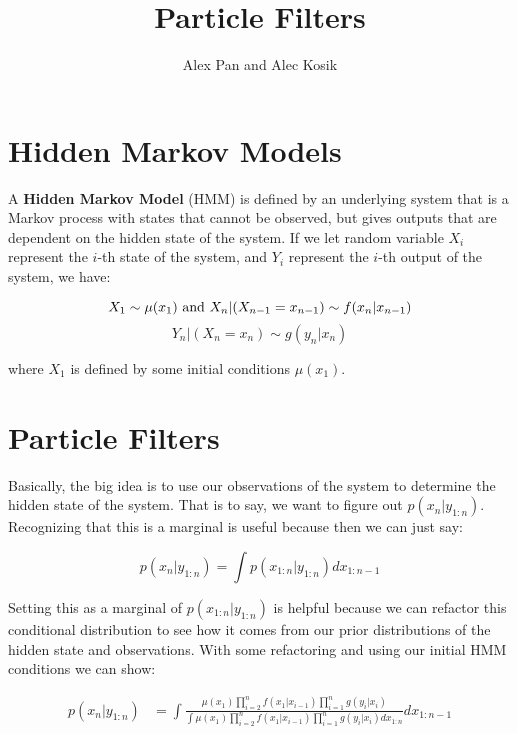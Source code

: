 \documentclass{article}
\title{Particle Filters}
\author{Alex Pan and Alec Kosik}
\date{}
\begin{document}
\maketitle

\section{Hidden Markov Models}

A \textbf{Hidden Markov Model} (HMM) is defined by an underlying system that is a Markov process with states that cannot be observed, but gives outputs that are dependent on the hidden state of the system. If we let random variable $X_i$ represent the $i$-th state of the system, and $Y_i$ represent the $i$-th output of the system, we have:

\begin{equation}
X_1 \sim \mu (x_1) \textnormal{ and } X_n|(X_{n-1}=x_{n-1}) \sim f(x_n|x_{n-1})
\end{equation}
\begin{equation}
Y_n|(X_n = x_n) \sim g(y_n|x_n)
\end{equation}

where $X_1$ is defined by some initial conditions $\mu(x_1)$.

\section{Particle Filters}

Basically, the big idea is to use our observations of the system to determine the hidden state of the system. That is to say, we want to figure out $p(x_{n}|y_{1:n})$. Recognizing that this is a marginal is useful because then we can just say:

\begin{equation}
p(x_{n}|y_{1:n}) = \int p(x_{1:n}|y_{1:n}) dx_{1:n-1}
\end{equation}

Setting this as a marginal of $p(x_{1:n}|y_{1:n})$ is helpful because we can refactor this conditional distribution to see how it comes from our prior distributions of the hidden state and observations. With some refactoring and using our initial HMM conditions we can show:

\begin{equation}
\begin{split}
p(x_{n}|y_{1:n}) &= \int \frac{\mu(x_1)\prod_{i=2}^{n} f(x_1|x_{i-1})\prod_{i=1}^{n} g(y_i|x_i)}{\int \mu(x_1)\prod_{i=2}^{n} f(x_1|x_{i-1})\prod_{i=1}^{n} g(y_i|x_i) dx_{1:n}} dx_{1:n-1}
\end{split}
\end{equation}
\end{document}
